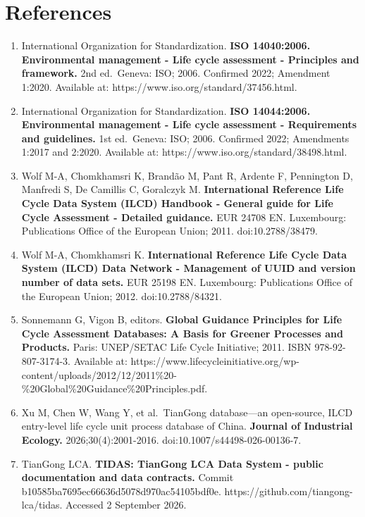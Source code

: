 \documentclass[
  10pt,
  a4paper,
  DIV=11,
  numbers=noendperiod]{scrartcl}
\providecommand{\tightlist}{%
  \setlength{\itemsep}{0pt}\setlength{\parskip}{0pt}}
\begin{document}
\section{References}\label{references}

\begin{enumerate}
\def\labelenumi{\arabic{enumi}.}
\tightlist
\item
  International Organization for Standardization. \textbf{ISO
  14040:2006. Environmental management - Life cycle assessment -
  Principles and framework.} 2nd ed.~Geneva: ISO; 2006. Confirmed 2022;
  Amendment 1:2020. Available at:
  https://www.iso.org/standard/37456.html.
\item
  International Organization for Standardization. \textbf{ISO
  14044:2006. Environmental management - Life cycle assessment -
  Requirements and guidelines.} 1st ed.~Geneva: ISO; 2006. Confirmed
  2022; Amendments 1:2017 and 2:2020. Available at:
  https://www.iso.org/standard/38498.html.
\item
  Wolf M-A, Chomkhamsri K, Brandão M, Pant R, Ardente F, Pennington D,
  Manfredi S, De Camillis C, Goralczyk M. \textbf{International
  Reference Life Cycle Data System (ILCD) Handbook - General guide for
  Life Cycle Assessment - Detailed guidance.} EUR 24708 EN. Luxembourg:
  Publications Office of the European Union; 2011. doi:10.2788/38479.
\item
  Wolf M-A, Chomkhamsri K. \textbf{International Reference Life Cycle
  Data System (ILCD) Data Network - Management of UUID and version
  number of data sets.} EUR 25198 EN. Luxembourg: Publications Office of
  the European Union; 2012. doi:10.2788/84321.
\item
  Sonnemann G, Vigon B, editors. \textbf{Global Guidance Principles for
  Life Cycle Assessment Databases: A Basis for Greener Processes and
  Products.} Paris: UNEP/SETAC Life Cycle Initiative; 2011. ISBN
  978-92-807-3174-3. Available at:
  https://www.lifecycleinitiative.org/wp-content/uploads/2012/12/2011\%20-\%20Global\%20Guidance\%20Principles.pdf.
\item
  Xu M, Chen W, Wang Y, et al.~TianGong database---an open-source, ILCD
  entry-level life cycle unit process database of China. \textbf{Journal
  of Industrial Ecology.} 2026;30(4):2001-2016.
  doi:10.1007/s44498-026-00136-7.
\item
  TianGong LCA. \textbf{TIDAS: TianGong LCA Data System - public
  documentation and data contracts.} Commit
  b10585ba7695ec66636d5078d970ac54105bdf0e.
  https://github.com/tiangong-lca/tidas. Accessed 2 September 2026.

\end{enumerate}
\end{document}
